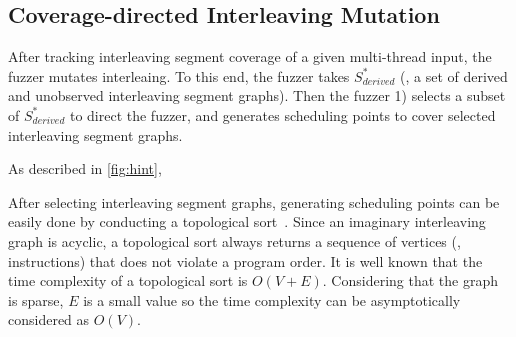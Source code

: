 


\subsection{Coverage-directed Interleaving Mutation}
\label{ss:scheduler}
%
After tracking interleaving segment coverage of a given multi-thread
input, the fuzzer mutates interleaing.
%
To this end, the fuzzer takes $S^{*}_{derived}$ (\ie, a set of derived
and unobserved interleaving segment graphs). Then the fuzzer 1)
selects a subset of $S^{*}_{derived}$ to direct the fuzzer, and
generates scheduling points to cover selected interleaving segment
graphs.





%
As described in \autoref{fig:hint}, 




%
After selecting interleaving segment graphs, generating scheduling
points can be easily done by conducting a topological
sort~\cite{topologicalsort}.
%
Since an imaginary interleaving graph is acyclic, a topological sort
always returns a sequence of vertices (\ie, instructions) that does
not violate a program order.
%
It is well known that the time complexity of a topological sort is
$O(V+E)$. Considering that the graph is sparse, $E$ is a small value
so the time complexity can be asymptotically considered as $O(V)$.



